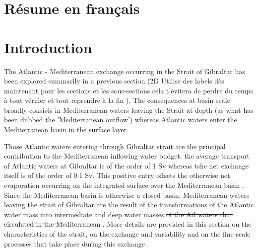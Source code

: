 \hypersetup{pdfborder=0 0 0}




\section{Résume en français}



\section{Introduction}

The Atlantic - Mediterranean exchange occurring in the Strait of Gibraltar has been \color{blue} explored \color{black} summarily in a previous section (2D \color{blue} Utilise des labels dès maintenant pour les sections et les sous-sections cela t'évitera de perdre du temps à tout vérifier et tout reprendre à la fin \color{black}). \color{blue} The consequences at basin scale broadly \color{black} consists in Mediterranean waters leaving the Strait at depth (as what has been dubbed the 'Mediterranean outflow') whereas \color{blue}Atlantic\color{black} waters enter the Mediterranean basin in the surface layer.

Those Atlantic waters entering through Gibraltar strait are the principal contribution to the Mediterranean inflowing water budget: the average transport of Atlantic waters at \color{blue}Gibraltar \color{black} is of the order of 1 Sv whereas tshe net exchange itself is of the order of 0.1 Sv. \color{blue} This positive entry offsets the otherwise net evaporation occurring on the integrated surface \color{blue}over \color{black} the Mediterranean basin \citep{bryden_1994}.
Since the Mediterranean basin is otherwise a closed basin, Mediterranean waters leaving the strait of Gibraltar are the result of the transformations \color{blue} of the Atlantic water mass \color{black} into intermediate and deep water masses\color{blue}\sout{ of the Atl waters that circulated in the Mediterranean} \color{black}.
More details are provided in this section on the characteristics of the strait, \color{blue} on the exchange and variability and on the fine-scale processes that take place during this exchange \color{black}.




